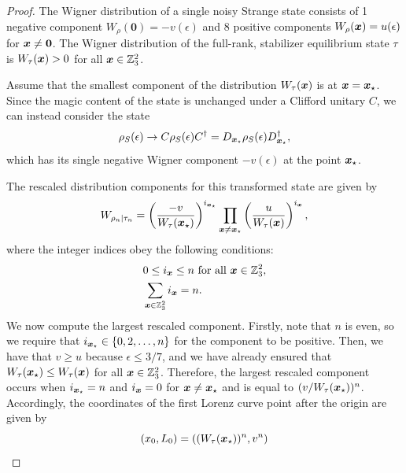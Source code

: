 \documentclass[pra,
aps,
twocolumn,
superscriptaddress,
groupedaddress,
nofootinbib,
reprint
]{revtex4-1}
\begin{document}
\begin{proof}
The Wigner distribution of a single noisy Strange state consists of 1 negative component $W_{\rho}(\mathbf{0}) = -v(\epsilon)$ and 8 positive components $W_{\rho}(\bm{x}) = u(\epsilon)$ for $\bm{x} \neq \bm{0}$.
The Wigner distribution of the full-rank, stabilizer equilibrium state $\tau$ is $W_{\tau}(\bm{x}) > 0$ for all $\bm{x} \in \mathbb{Z}_3^2$.

Assume that the smallest component of the distribution $W_\tau(\boldsymbol{x})$ is at $\boldsymbol{x}=\boldsymbol{x}_\star$. Since the magic content of the state is unchanged under a Clifford unitary $C$, we can instead consider the state
\begin{equation}
\rho_S(\epsilon) \rightarrow C \rho_S(\epsilon) C^\dagger = D_{\boldsymbol{x}_\star} \rho_S(\epsilon) D_{\boldsymbol{x}_\star}^\dagger,
\end{equation}
which has its single negative Wigner component $-v(\epsilon)$ at the point $\boldsymbol{x}_\star$.


The rescaled distribution components for this transformed state are given by
\begin{equation}
	W_{\rho_n|\tau_n} = \left(\frac{-v}{W_{\tau}(\boldsymbol{x}_\star)}\right)^{i_{\boldsymbol{x}_\star}} \prod_{\bm{x} \neq \boldsymbol{x}_\star} \left(\frac{u}{W_{\tau}(\bm{x})}\right)^{i_{\bm{x}}},
\end{equation}
where the integer indices obey the following conditions:
\begin{align}
&0 \leq i_{\bm{x}} \leq n \mbox{ for all } \bm{x} \in \mathbb{Z}_3^2, \nonumber \\
&\sum_{\bm{x} \in \mathbb{Z}_3^2} i_{\bm{x}} = n.
\end{align}
We now compute the largest rescaled component.
Firstly, note that $n$ is even, so we require that $i_{\boldsymbol{x}_\star} \in \{0,2,\dots,n\}$ for the component to be positive.
Then, we have that $v \geq u$ because $\epsilon \leq 3/7$, and we have already ensured that $W_{\tau}(\boldsymbol{x}_\star) \leq W_{\tau}(\bm{x})$ for all $\bm{x} \in \mathbb{Z}_3^2$.
Therefore, the largest rescaled component occurs when $i_{\boldsymbol{x}_{\star}} = n$ and $i_{\boldsymbol{x}} = 0$ for $\boldsymbol{x} \neq \boldsymbol{x}_\star$ and is equal to $(v/W_{\tau}(\boldsymbol{x}_\star))^n$.
Accordingly, the coordinates of the first Lorenz curve point after the origin are given by
\begin{equation}
	(x_0, L_0) = ((W_{\tau}(\boldsymbol{x}_\star))^n, v^n)
\end{equation}


\end{proof}
\end{document}
